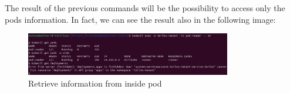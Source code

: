 The result of the previous commands will be the possibility to access only the pods information. In fact, we can see the result also in the following image:
\begin{figure}[h!]
    \centering
    \includegraphics[width=0.8\textwidth]{images/kubectl-pod.png}
    \caption{Retrieve information from inside pod}
    \label{fig:kubectl-pod}
\end{figure} \\
